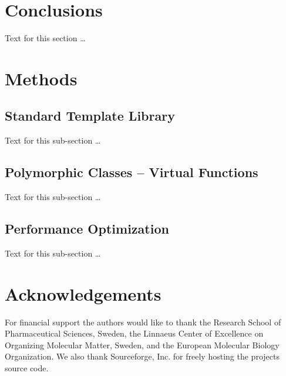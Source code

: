 \documentclass[10pt]{bmc_article}
\newenvironment{bmcformat}{\fussy\setboolean{publ}{true}}{\fussy}
\begin{document}
\begin{bmcformat}
    

\section*{Conclusions}
  Text for this section \ldots


  
\section*{Methods}
  \subsection*{Standard Template Library}
    Text for this sub-section \ldots

  \subsection*{Polymorphic Classes -- Virtual Functions}
    Text for this sub-section \ldots

  \subsection*{Performance Optimization}
    Text for this sub-section \ldots


    

    

\section*{Acknowledgements}
  For financial support the authors would like to thank the Research School of Pharmaceutical Sciences, Sweden, the Linnaeus Center of Excellence on Organizing Molecular Matter, Sweden,
and the European Molecular Biology Organization. We also thank Sourceforge, Inc. for freely hosting the projects source code.

 


\end{bmcformat}
\end{document}
